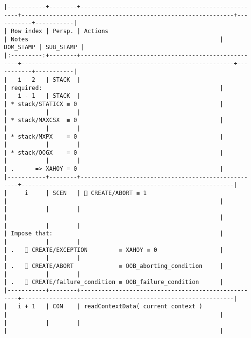 \documentclass[varwidth=\maxdimen,margin=0.5cm,multi={verbatim}]{standalone}
\begin{document}
\begin{verbatim}
|-----------+--------+----------------------------------------------------+-------------------------------------------------------------+-----------+-----------|
| Row index | Persp. | Actions                                            | Notes                                                       | DOM_STAMP | SUB_STAMP |
|:---------:+--------+----------------------------------------------------+-------------------------------------------------------------+-----------+-----------|
|   i - 2   | STACK  |                                                    | required:                                                   |
|   i - 1   | STACK  |                                                    | * stack/STATICX ≡ 0                                         |
|           |        |                                                    | * stack/MAXCSX  ≡ 0                                         |
|           |        |                                                    | * stack/MXPX    ≡ 0                                         |
|           |        |                                                    | * stack/OOGX    ≡ 0                                         |
|           |        |                                                    | .      => XAHOY ≡ 0                                         |
|-----------+--------+----------------------------------------------------+-------------------------------------------------------------|
|     i     | SCEN   |  CREATE/ABORT ≡ 1                                 |                                                             |
|           |        |                                                    |                                                             |
|           |        |                                                    | Impose that:                                                |
|           |        |                                                    | .    CREATE/EXCEPTION         ≡ XAHOY ≡ 0                  |
|           |        |                                                    | .    CREATE/ABORT             ≡ OOB_aborting_condition     |
|           |        |                                                    | .    CREATE/failure_condition ≡ OOB_failure_condition      |
|-----------+--------+----------------------------------------------------+-------------------------------------------------------------|
|   i + 1   | CON    | readContextData( current context )                 |                                                             |
|           |        |                                                    |                                                             |

\end{verbatim}
\end{document}
